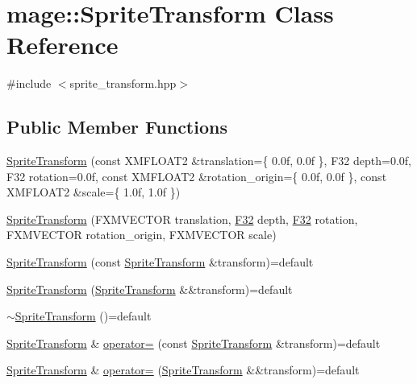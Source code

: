 \hypertarget{classmage_1_1_sprite_transform}{}\section{mage\+:\+:Sprite\+Transform Class Reference}
\label{classmage_1_1_sprite_transform}


{\ttfamily \#include $<$sprite\+\_\+transform.\+hpp$>$}

\subsection*{Public Member Functions}
\begin{DoxyCompactItemize}
\item 
\hyperlink{classmage_1_1_sprite_transform_aeffbb76031558a370d653aaed8c00770}{Sprite\+Transform} (const X\+M\+F\+L\+O\+A\+T2 \&translation=\{ 0.\+0f, 0.\+0f \}, F32 depth=0.\+0f, F32 rotation=0.\+0f, const X\+M\+F\+L\+O\+A\+T2 \&rotation\+\_\+origin=\{ 0.\+0f, 0.\+0f \}, const X\+M\+F\+L\+O\+A\+T2 \&scale=\{ 1.\+0f, 1.\+0f \})
\item 
\hyperlink{classmage_1_1_sprite_transform_a4016fcd8291f51dd3d75f89943b4bf8c}{Sprite\+Transform} (F\+X\+M\+V\+E\+C\+T\+OR translation, \hyperlink{namespacemage_aa97e833b45f06d60a0a9c4fc22ae02c0}{F32} depth, \hyperlink{namespacemage_aa97e833b45f06d60a0a9c4fc22ae02c0}{F32} rotation, F\+X\+M\+V\+E\+C\+T\+OR rotation\+\_\+origin, F\+X\+M\+V\+E\+C\+T\+OR scale)
\item 
\hyperlink{classmage_1_1_sprite_transform_a0126a3f6c7f486f10ec5d5ffd1180698}{Sprite\+Transform} (const \hyperlink{classmage_1_1_sprite_transform}{Sprite\+Transform} \&transform)=default
\item 
\hyperlink{classmage_1_1_sprite_transform_a53d7da4498f4f9f67be2994eb4593c3a}{Sprite\+Transform} (\hyperlink{classmage_1_1_sprite_transform}{Sprite\+Transform} \&\&transform)=default
\item 
\hyperlink{classmage_1_1_sprite_transform_a14a3614023996cbb071c3de99f9528bc}{$\sim$\+Sprite\+Transform} ()=default
\item 
\hyperlink{classmage_1_1_sprite_transform}{Sprite\+Transform} \& \hyperlink{classmage_1_1_sprite_transform_af0adccff92d48e7b347e66277981ee07}{operator=} (const \hyperlink{classmage_1_1_sprite_transform}{Sprite\+Transform} \&transform)=default
\item 
\hyperlink{classmage_1_1_sprite_transform}{Sprite\+Transform} \& \hyperlink{classmage_1_1_sprite_transform_a9278d3fd0a6d346b188515b67a1adfc2}{operator=} (\hyperlink{classmage_1_1_sprite_transform}{Sprite\+Transform} \&\&transform)=default

\end{DoxyCompactItemize}
